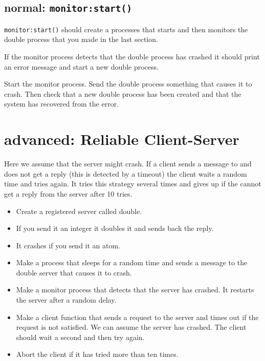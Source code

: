 \documentclass[12pt]{hitec}
\begin{document}
\subsection{normal: \texttt{monitor:start()}}

\verb+monitor:start()+ should create a processes that starts and
then monitors the double process that you made in the last section.
 
If the monitor process detects that the double process has crashed
it should print an error message and start a new double process.

Start the monitor process. Send the double process something that causes it
to crash. Then check that a new double process has been created and that
the system has recovered from the error.

\section{advanced: Reliable Client-Server}

Here we assume that the server might crash. If a client sends a message to
and does not get a reply (this is detected by a timeout) the client
waits a random time and tries again. It tries this strategy several times
and gives up if the cannot get a reply from the server after 10 tries. 

\begin{itemize}

\item Create a registered server called double.

\item If you send it an integer it doubles it and sends back the reply.

\item It crashes if you send it an atom.

\item Make a process that sleeps for a random time and sends a message
  to the double server that causes it to crash.

\item Make a monitor process that detects that the server has
  crashed. It restarts the server after a random delay.

\item Make a client function that sends a request to the server and
  times out if the request is not satisfied. We can assume the server
  has crashed. The client should wait a second and then try again.

\item  Abort the client if it has tried more than ten times.
\end{itemize}
\end{document}

